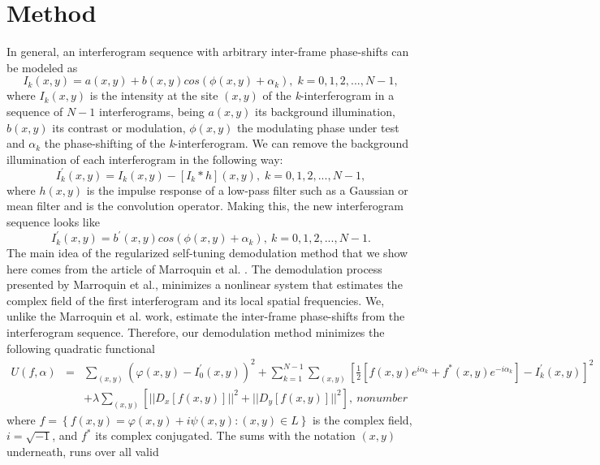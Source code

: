 \section{Method }

In general, an interferogram sequence with arbitrary inter-frame phase-shifts
can be modeled as 
\begin{equation}
I_{k}(x,y)=a(x,y)+b(x,y)cos(\phi(x,y)+\alpha_{k}),\; k=0,1,2,...,N-1,\label{eq:
Ik}
\end{equation}
 where $I_{k}(x,y)$ is the intensity at the site $(x,y)$ of the
\emph{k}-interferogram in a sequence of $N-1$ interferograms, being
$a(x,y)$ its background illumination, $b(x,y)$ its contrast or modulation,
$\phi(x,y)$ the modulating phase under test and $\alpha_{k}$ the
phase-shifting of the \emph{k}-interferogram. We can remove the background
illumination of each interferogram in the following way: 
\begin{equation}
I_{k}^{'}(x,y)=I_{k}(x,y)-[I_{k}*h](x,y),\; k=0,1,2,...,N-1,\label{eq:I'}
\end{equation}
where $h(x,y)$ is the impulse response of a low-pass filter such
as a Gaussian or mean filter and \textasteriskcentered{} is the convolution
operator\cite{a20}. Making this, the new interferogram sequence looks
like 
\begin{equation}
I_{k}^{'}(x,y)=b^{'}(x,y)cos(\phi(x,y)+\alpha_{k}),\: k=0,1,2,...,N-1.\label{eq:
I'2}
\end{equation}
The main idea of the regularized self-tuning demodulation method that
we show here comes from the article of Marroquin et al. \cite{a18}.
The demodulation process presented by Marroquin et al., minimizes
a nonlinear system that estimates the complex field of the first interferogram
and its local spatial frequencies. We, unlike the Marroquin et al.
work, estimate the inter-frame phase-shifts from the interferogram
sequence. Therefore, our demodulation method minimizes the following
quadratic functional
\begin{eqnarray}
U(f,\alpha) & = & \sum_{(x,y)}(\varphi(x,y)-I_{0}^{'}(x,y))^{2}+\sum_{k=1}^{N-1}
\sum_{(x,y)}[\frac{1}{2}[f(x,y)e^{i\alpha_{k}}+f^{*}(x,y)e^{-i\alpha_{k}}]-I_{k}
^{'}(x,y)]^{2}\label{eq:U}\\
 &  & +\lambda\sum_{(x,y)}[||D_{x}[f(x,y)]||^{2}+||D_{y}[f(x,y)]||^{2}],\
nonumber 
\end{eqnarray}
where $f=\left\{ f(x,y)=\varphi(x,y)+i\psi(x,y):(x,y)\in L\right\} $
is the complex field, $i=\sqrt{-1}$, and $f^{*}$ its complex conjugated.
The sums with the notation $(x,y)$ underneath, runs over all valid
